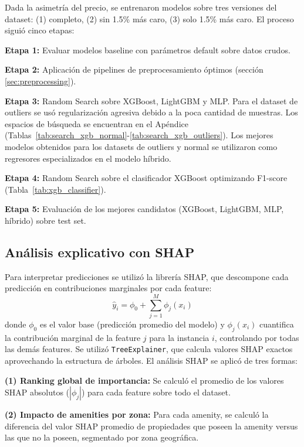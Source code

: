 \documentclass[conference]{IEEEtran}
\begin{document}
    Dada la asimetría del precio, se entrenaron modelos sobre tres versiones del dataset: (1) completo, (2) sin 1.5\% más caro, (3) solo 1.5\% más caro. El proceso siguió cinco etapas:

    \textbf{Etapa 1:} Evaluar modelos baseline con parámetros default sobre datos crudos.

    \textbf{Etapa 2:} Aplicación de pipelines de preprocesamiento óptimos (sección \ref{sec:preprocessing}).

    \textbf{Etapa 3:} Random Search sobre XGBoost, LightGBM y MLP. Para el dataset de outliers se usó regularización agresiva debido a la poca cantidad de muestras. Los espacios de búsqueda se encuentran en el Apéndice (Tablas~\ref{tab:search_xgb_normal}-\ref{tab:search_xgb_outliers}). Los mejores modelos obtenidos para los datasets de outliers y normal se utilizaron como regresores especializados en el modelo híbrido.

    \textbf{Etapa 4:} Random Search sobre el clasificador XGBoost optimizando F1-score (Tabla~\ref{tab:xgb_classifier}).

    \textbf{Etapa 5:} Evaluación de los mejores candidatos (XGBoost, LightGBM, MLP, híbrido) sobre test set.

\subsection{Análisis explicativo con SHAP}
Para interpretar predicciones se utilizó la librería SHAP, que descompone cada predicción en contribuciones marginales por cada feature:
\begin{equation}
    \hat{y}_i = \phi_0 + \sum_{j=1}^{M} \phi_j(x_i)
\end{equation}
donde $\phi_0$ es el valor base (predicción promedio del modelo) y $\phi_j(x_i)$ cuantifica la contribución marginal de la feature $j$ para la instancia $i$, controlando por todas las demás features. Se utilizó \texttt{TreeExplainer}, que calcula valores SHAP exactos aprovechando la estructura de árboles.
El análisis SHAP se aplicó de tres formas: 

\textbf{(1) Ranking global de importancia:} Se calculó el promedio de los valores SHAP absolutos ($|\phi_j|$) para cada feature sobre todo el dataset.

\textbf{(2) Impacto de amenities por zona:} Para cada amenity, se calculó la diferencia del valor SHAP promedio de propiedades que poseen la amenity versus las que no la poseen, segmentado por zona geográfica.
\end{document}
